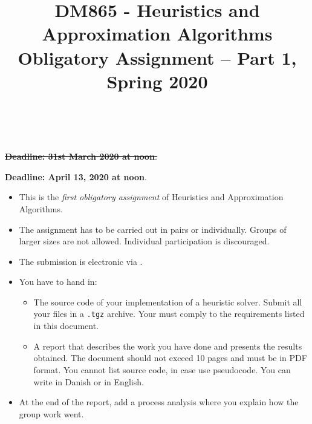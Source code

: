 \documentclass[a4paper,10pt]{article}
\title{\begin{flushleft}
DM865 - Heuristics and Approximation Algorithms\\[0.3cm]
{\Large Obligatory Assignment -- Part 1, Spring 2020 %
}
\\
\hrulefill
\\[-1.8cm]
\end{flushleft}
}
\author{}
\date{}
\begin{document}
\maketitle

\begin{center}
\sout{  {\textbf{Deadline: 31st March 2020 at noon}.}}
  
\color{blue}\textbf{Deadline: April 13, 2020 at noon}.\color{black}
\end{center}
\bigskip



\begin{itemize}

\item This is the \emph{first obligatory assignment} of Heuristics and
  Approximation Algorithms. %

  
\item The assignment has to be carried out in pairs or
  individually. Groups of larger sizes are not allowed. Individual
  participation is discouraged.

\item The submission is electronic via
  .

\item  You have to hand in:
  \begin{itemize}
  \item The source code of your implementation of a heuristic
    solver. Submit all your files in a \lstinline{.tgz} archive. Your
    must comply to the requirements listed in this document.
    
  \item A report that describes the work you have done and presents the
    results obtained. The document should not exceed 10 pages and must
    be in PDF format. You cannot list source code, in case use
    pseudocode. You can write in Danish or in English.
  \end{itemize} 

\item At the end of the report, add a process analysis where you
  explain how the group work went.
  
%


\end{itemize}
\end{document}
